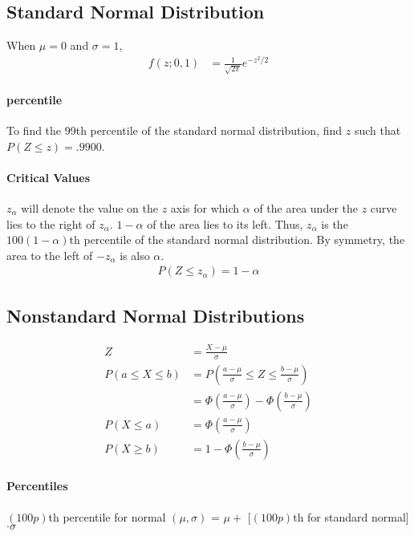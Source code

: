 \documentclass[paper=A4, pagesize, fontsize=7pt, DIV=calc]{scrartcl}
\begin{document}
\begin{minipage}[t]{.45\linewidth}
  \subsection{Standard Normal Distribution}
  When $\mu = 0$ and $\sigma = 1$,
  \begin{align*}
    f(z; 0, 1) &= \frac{1}{\sqrt{2\pi}} e^{-z^2 / 2}
  \end{align*}
\end{minipage}
\begin{minipage}[t]{.45\linewidth}
  \paragraph{percentile}
  To find the 99th percentile of the standard normal distribution, find $z$ such that $P(Z \le z) = .9900$.

  \paragraph{Critical Values}
  $z_\alpha$ will denote the value on the $z$ axis for which $\alpha$ of the area under the $z$ curve lies to the right of $z_\alpha$. $1 - \alpha$ of the area lies to its left. Thus, $z_\alpha$ is the $100(1 - \alpha)$th percentile of the standard normal distribution. By symmetry, the area to the left of $-z_\alpha$ is also $\alpha$.
  \begin{align*}
    P(Z \le z_\alpha) = 1 - \alpha
  \end{align*}

  \subsection{Nonstandard Normal Distributions}
  \begin{align*}
    Z &= \frac{X - \mu}{\sigma} \\
    P(a \le X \le b) &= P\left(\frac{a - \mu}{\sigma} \le Z \le \frac{b - \mu}{\sigma}\right) \\
    &= \Phi\left(\frac{a - \mu}{\sigma}\right) - \Phi\left(\frac{b - \mu}{\sigma}\right) \\
    P(X \le a) &= \Phi\left(\frac{a - \mu}{\sigma}\right) \\
    P(X \ge b) &= 1 - \Phi\left(\frac{b - \mu}{\sigma}\right)
  \end{align*}

  \paragraph{Percentiles}
  $(100p)$th percentile for normal $(\mu, \sigma)$ = $\mu + $ [$(100p)$th for standard normal] $\cdot \sigma$


\end{minipage}
\end{document}
